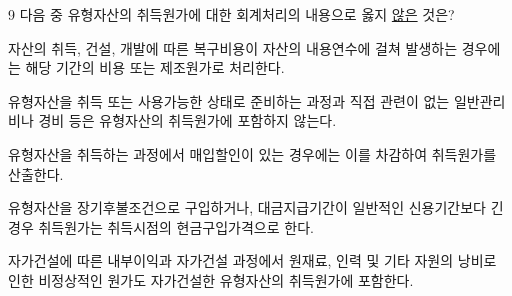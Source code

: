 \begin{question}{9}
다음 중 유형자산의 취득원가에 대한 회계처리의 내용으로 옳지 \uline{않은} 것은?
\begin{choices}
  \item 자산의 취득, 건설, 개발에 따른 복구비용이 자산의 내용연수에 걸쳐 발생하는 경우에는 해당 기간의 비용 또는 제조원가로 처리한다.
  \item 유형자산을 취득 또는 사용가능한 상태로 준비하는 과정과 직접 관련이 없는 일반관리비나 경비 등은 유형자산의 취득원가에 포함하지 않는다.
  \item 유형자산을 취득하는 과정에서 매입할인이 있는 경우에는 이를 차감하여 취득원가를 산출한다.
  \item 유형자산을 장기후불조건으로 구입하거나, 대금지급기간이 일반적인 신용기간보다 긴 경우 취득원가는 취득시점의 현금구입가격으로 한다.
  \item 자가건설에 따른 내부이익과 자가건설 과정에서 원재료, 인력 및 기타 자원의 낭비로 인한 비정상적인 원가도 자가건설한 유형자산의 취득원가에 포함한다.
\end{choices}
\end{question}
